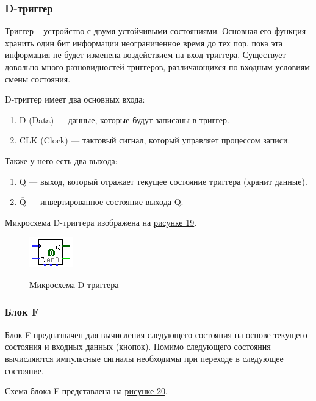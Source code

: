 \documentclass[10pt,a4paper,final]{article} %
\begin{document}
\subsubsection{D-триггер}
Триггер -- устройство с двумя устойчивыми состояниями. Основная его функция - хранить один бит информации неограниченное время до тех пор, пока эта информация не будет изменена воздействием на вход триггера. Существует довольно много разновидностей триггеров, различающихся по входным условиям смены состояния. 

D-триггер имеет два основных входа:
\begin{enumerate}
	\item D (Data) — данные, которые будут записаны в триггер.
	\item CLK (Clock) — тактовый сигнал, который управляет процессом записи.
\end{enumerate}

Также у него есть два выхода:
\begin{enumerate}
	\item Q — выход, который отражает текущее состояние триггера (хранит данные).
	\item $\overline{\text{Q}}$ — инвертированное состояние выхода Q.
\end{enumerate}


Микросхема D-триггера изображена на \hyperref[D-trigger]{рисунке 19}.

\begin{figure}[htpb]
	\centering
	\includegraphics[scale=0.8]{logisim/img/D-trigger.png}
	\label{D-trigger} 
	\caption{Микросхема D-триггера}
\end{figure}

\subsubsection{Блок F}
Блок F предназначен для вычисления следующего состояния на основе текущего состояния и входных данных (кнопок). Помимо следующего состояния вычисляются  импульсные сигналы необходимы при переходе в следующее состояние.

Схема блока F представлена на \hyperref[F-block]{рисунке 20}.
\end{document}
